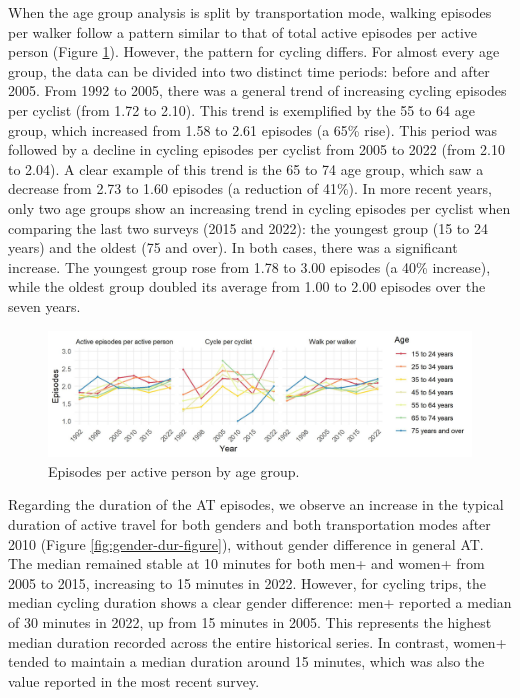 \documentclass[preprint, 3p,
authoryear]{elsarticle} %
\begin{document}
When the age group analysis is split by transportation mode, walking
episodes per walker follow a pattern similar to that of total active
episodes per active person (Figure \ref{fig:age-eps-figure}). However,
the pattern for cycling differs. For almost every age group, the data
can be divided into two distinct time periods: before and after 2005.
From 1992 to 2005, there was a general trend of increasing cycling
episodes per cyclist (from 1.72 to 2.10). This trend is exemplified by
the 55 to 64 age group, which increased from 1.58 to 2.61 episodes (a
65\% rise). This period was followed by a decline in cycling episodes
per cyclist from 2005 to 2022 (from 2.10 to 2.04). A clear example of
this trend is the 65 to 74 age group, which saw a decrease from 2.73 to
1.60 episodes (a reduction of 41\%). In more recent years, only two age
groups show an increasing trend in cycling episodes per cyclist when
comparing the last two surveys (2015 and 2022): the youngest group (15
to 24 years) and the oldest (75 and over). In both cases, there was a
significant increase. The youngest group rose from 1.78 to 3.00 episodes
(a 40\% increase), while the oldest group doubled its average from 1.00
to 2.00 episodes over the seven years.

\begin{figure}
\includegraphics[width=1\linewidth]{figures/eps_age_graph} \caption{Episodes per active person by age group.}\label{fig:age-eps-figure}
\end{figure}

Regarding the duration of the AT episodes, we observe an increase in the
typical duration of active travel for both genders and both
transportation modes after 2010 (Figure \ref{fig:gender-dur-figure}),
without gender difference in general AT. The median remained stable at
10 minutes for both men+ and women+ from 2005 to 2015, increasing to 15
minutes in 2022. However, for cycling trips, the median cycling duration
shows a clear gender difference: men+ reported a median of 30 minutes in
2022, up from 15 minutes in 2005. This represents the highest median
duration recorded across the entire historical series. In contrast,
women+ tended to maintain a median duration around 15 minutes, which was
also the value reported in the most recent survey.
\end{document}
